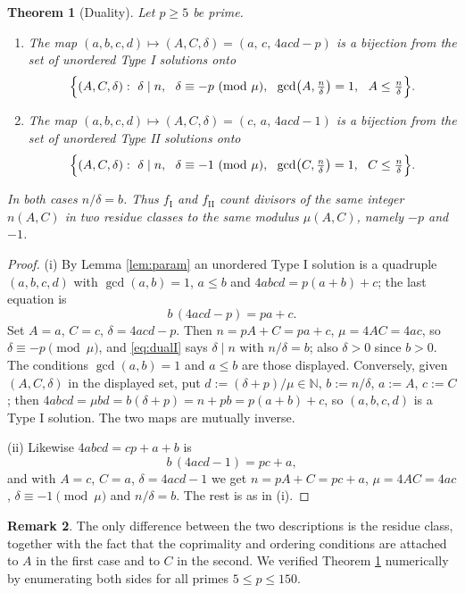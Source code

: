 \documentclass[11pt,reqno]{amsart}
\theoremstyle{plain}
\newtheorem{theorem}{Theorem}[section]
\theoremstyle{definition}
\newtheorem{remark}[theorem]{Remark}
\numberwithin{equation}{section}
\newcommand{\N}{\mathbb{N}}
\newcommand{\fI}{f_{\mathrm{I}}}
\newcommand{\fII}{f_{\mathrm{II}}}
\begin{document}
\begin{theorem}[Duality]\label{thm:duality}
Let $p\ge5$ be prime.
\begin{enumerate}
\item[(i)] The map $(a,b,c,d)\mapsto(A,C,\delta)=(a,\,c,\,4acd-p)$ is a bijection from
the set of unordered Type I solutions onto
\[
  \Bigl\{(A,C,\delta):\ \delta\mid n,\ \ \delta\equiv-p\ (\mathrm{mod}\ \mu),\ \
  \gcd\bigl(A,\tfrac n\delta\bigr)=1,\ \ A\le\tfrac n\delta\Bigr\}.
\]
\item[(ii)] The map $(a,b,c,d)\mapsto(A,C,\delta)=(c,\,a,\,4acd-1)$ is a bijection from
the set of unordered Type II solutions onto
\[
  \Bigl\{(A,C,\delta):\ \delta\mid n,\ \ \delta\equiv-1\ (\mathrm{mod}\ \mu),\ \
  \gcd\bigl(C,\tfrac n\delta\bigr)=1,\ \ C\le\tfrac n\delta\Bigr\}.
\]
\end{enumerate}
In both cases $n/\delta=b$. Thus $\fI$ and $\fII$ count divisors of the \emph{same}
integer $n(A,C)$ in two residue classes to the \emph{same} modulus $\mu(A,C)$, namely
$-p$ and $-1$.
\end{theorem}

\begin{proof}
(i) By Lemma \ref{lem:param} an unordered Type I solution is a quadruple $(a,b,c,d)$
with $\gcd(a,b)=1$, $a\le b$ and $4abcd=p(a+b)+c$; the last equation is
\begin{equation}\label{eq:dualI}
  b\,(4acd-p)=pa+c .
\end{equation}
Set $A=a$, $C=c$, $\delta=4acd-p$. Then $n=pA+C=pa+c$, $\mu=4AC=4ac$, so
$\delta\equiv-p\pmod \mu$, and \eqref{eq:dualI} says $\delta\mid n$ with $n/\delta=b$;
also $\delta>0$ since $b>0$. The conditions $\gcd(a,b)=1$ and $a\le b$ are those
displayed. Conversely, given $(A,C,\delta)$ in the displayed set, put
$d:=(\delta+p)/\mu\in\N$, $b:=n/\delta$, $a:=A$, $c:=C$; then
$4abcd=\mu bd=b(\delta+p)=n+pb=p(a+b)+c$, so $(a,b,c,d)$ is a Type I solution. The two
maps are mutually inverse.

(ii) Likewise $4abcd=cp+a+b$ is
\begin{equation}\label{eq:dualII}
  b\,(4acd-1)=pc+a ,
\end{equation}
and with $A=c$, $C=a$, $\delta=4acd-1$ we get $n=pA+C=pc+a$, $\mu=4AC=4ac$,
$\delta\equiv-1\pmod \mu$ and $n/\delta=b$. The rest is as in (i).
\end{proof}

\begin{remark}
The only difference between the two descriptions is the residue class, together with
the fact that the coprimality and ordering conditions are attached to $A$ in the first
case and to $C$ in the second. We verified Theorem \ref{thm:duality} numerically by
enumerating both sides for all primes $5\le p\le150$.
\end{remark}
\end{document}
